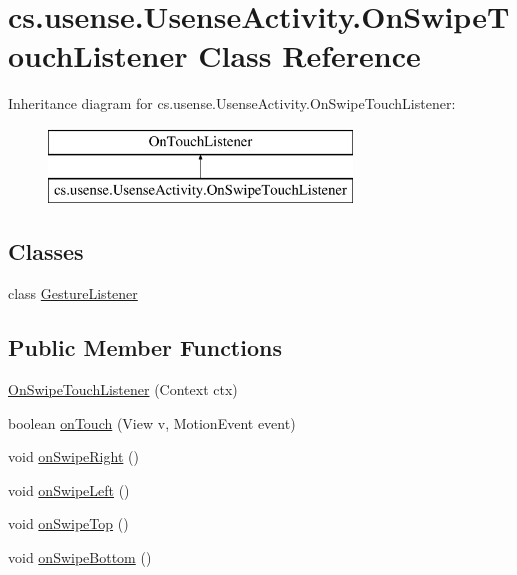 \hypertarget{classcs_1_1usense_1_1_usense_activity_1_1_on_swipe_touch_listener}{}\section{cs.\+usense.\+Usense\+Activity.\+On\+Swipe\+Touch\+Listener Class Reference}
\label{classcs_1_1usense_1_1_usense_activity_1_1_on_swipe_touch_listener}
Inheritance diagram for cs.\+usense.\+Usense\+Activity.\+On\+Swipe\+Touch\+Listener\+:\begin{figure}[H]
\begin{center}
\leavevmode
\includegraphics[height=2.000000cm]{classcs_1_1usense_1_1_usense_activity_1_1_on_swipe_touch_listener}
\end{center}
\end{figure}
\subsection*{Classes}
\begin{DoxyCompactItemize}
\item 
class \hyperlink{classcs_1_1usense_1_1_usense_activity_1_1_on_swipe_touch_listener_1_1_gesture_listener}{Gesture\+Listener}
\end{DoxyCompactItemize}
\subsection*{Public Member Functions}
\begin{DoxyCompactItemize}
\item 
\hyperlink{classcs_1_1usense_1_1_usense_activity_1_1_on_swipe_touch_listener_aed05a1be2374432a2b8276a94df9aceb}{On\+Swipe\+Touch\+Listener} (Context ctx)
\item 
boolean \hyperlink{classcs_1_1usense_1_1_usense_activity_1_1_on_swipe_touch_listener_ae07c9e2cbf4c4b0372819c73ca59d968}{on\+Touch} (View v, Motion\+Event event)
\item 
void \hyperlink{classcs_1_1usense_1_1_usense_activity_1_1_on_swipe_touch_listener_ad403aa8ed90105bc16f46d9087fb8bf6}{on\+Swipe\+Right} ()
\item 
void \hyperlink{classcs_1_1usense_1_1_usense_activity_1_1_on_swipe_touch_listener_a8e15c459d59ecdf58aeddf39b13d54ef}{on\+Swipe\+Left} ()
\item 
void \hyperlink{classcs_1_1usense_1_1_usense_activity_1_1_on_swipe_touch_listener_a5e0e15b1c69fbe2e6632f5982f67eef8}{on\+Swipe\+Top} ()
\item 
void \hyperlink{classcs_1_1usense_1_1_usense_activity_1_1_on_swipe_touch_listener_ad4d089fc2a9fa33f1094d321a3848eb2}{on\+Swipe\+Bottom} ()
\end{DoxyCompactItemize}
